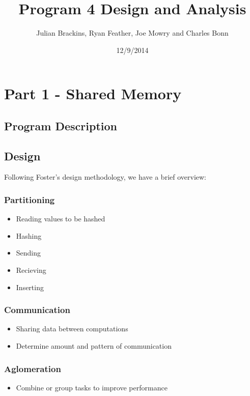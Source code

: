 \documentclass{article}
\begin{document}
\title{Program 4 Design and Analysis}
\author{Julian Brackins, Ryan Feather, Joe Mowry and Charles Bonn}
\date{12/9/2014}
\maketitle

\section{Part 1 - Shared Memory}

\subsection{Program Description}

\subsection{Design}
Following Foster's design methodology, we have a brief overview:

\subsubsection{Partitioning}
        \begin{itemize}
            \item Reading values to be hashed
            \item Hashing
            \item Sending
            \item Recieving
            \item Inserting
        \end{itemize}
\subsubsection{Communication}
        \begin{itemize}
            \item Sharing data between computations
            \item Determine amount and pattern of communication
        \end{itemize}
\subsubsection{Aglomeration}
        \begin{itemize}
            \item Combine or group tasks to improve performance
        \end{itemize}
\end{document}
